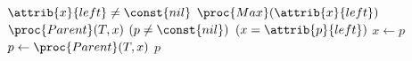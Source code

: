 \begin{codebox}
\li \If $\attrib{x}{left} \neq \const{nil}$
\li \Then
        \Return $\proc{Max}(\attrib{x}{left})$
\li \Else
\li     $\proc{Parent}(T,x)$
\li     \While $(p \neq \const{nil})$  $(x = \attrib{p}{left})$
\li     \Do
            $x \gets p$
\li         $p \gets \proc{Parent}(T,x)$
        \End
\li     \Return $p$
    \End
\end{codebox}